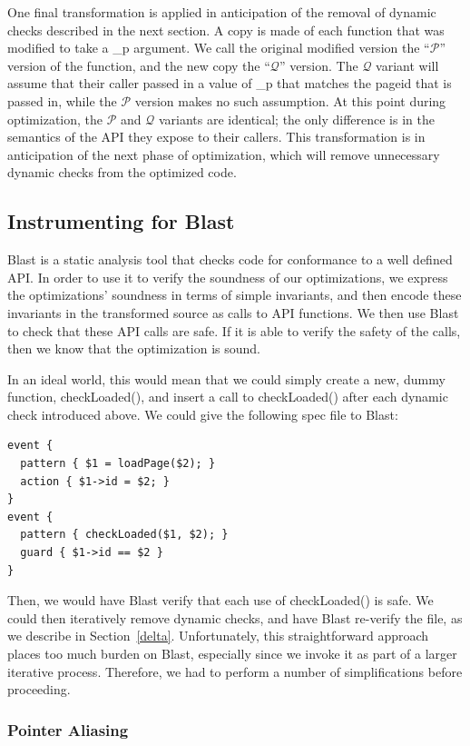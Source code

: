 \documentclass[10pt,letterpaper,twocolumn,english]{article}
\newcommand{\checkpage}{checkLoaded()\xspace}
\newcommand{\PP}{\_p\xspace}
\newcommand{\fP}{{$\mathcal P$}\xspace}
\newcommand{\fQ}{{$\mathcal Q$}\xspace}
\begin{document}
One final transformation is applied in anticipation of the removal of
dynamic checks described in the next section.  A copy is made of each
function that was modified to take a \PP argument.  We call the
original modified version the ``\fP'' version of the function, and the
new copy the ``\fQ'' version.  The \fQ variant will assume that their caller
passed in a value of \PP that matches the pageid that is passed in, while the \fP version makes no such assumption.
At this point during optimization, the \fP and \fQ variants are
identical; the only difference is in the semantics of the API they
expose to their callers.  This transformation is in anticipation of
the next phase of optimization, which will remove unnecessary dynamic
checks from the optimized code.

\subsection{Instrumenting for Blast}
\label{instrumenting}
Blast is a static analysis tool that checks code for conformance to a
well defined API.  In order to use it to verify the soundness of our
optimizations, we express the optimizations' soundness in terms of
simple invariants, and then encode these invariants in the transformed
source as calls to API functions.  We then use Blast to check that
these API calls are safe.  If it is able to verify the safety of the
calls, then we know that the optimization is sound.  

In an ideal world, this would mean that we could simply create a new,
dummy function, \checkpage, and insert a call to \checkpage
after each dynamic check introduced above.  We could give the
following spec file to Blast:

\begin{verbatim}
event { 
  pattern { $1 = loadPage($2); }
  action { $1->id = $2; }
}
event { 
  pattern { checkLoaded($1, $2); }  
  guard { $1->id == $2 }
}
\end{verbatim}

Then, we would have Blast verify that each use of \checkpage is safe.
We could then iteratively remove dynamic checks, and have Blast
re-verify the file, as we describe in Section~\ref{delta}.
Unfortunately, this straightforward approach places too much burden on
Blast, especially since we invoke it as part of a larger iterative
process.  Therefore, we had to perform a number of simplifications
before proceeding.

\subsubsection{Pointer Aliasing}
\end{document}
